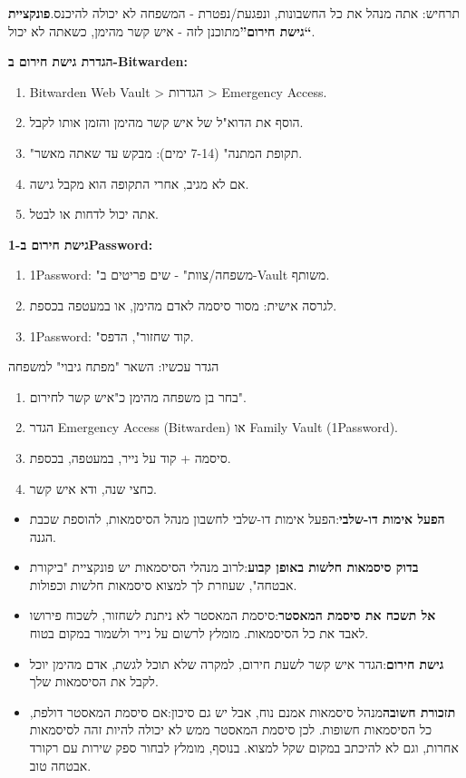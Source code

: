 
תרחיש: אתה מנהל את כל החשבונות, ונפגעת/נפטרת - המשפחה לא יכולה להיכנס.\textbf{פונקציית “גישת חירום”}מתוכנן לזה - איש קשר מהימן, כשאתה לא יכול.

\textbf{הגדרת גישת חירום ב-Bitwarden:}

\begin{enumerate}
  \item Bitwarden Web Vault > הגדרות > Emergency Access.
  \item הוסף את הדוא"ל של איש קשר מהימן והזמן אותו לקבל.
  \item "תקופת המתנה" (7-14 ימים): מבקש עד שאתה מאשר.
  \item אם לא מגיב, אחרי התקופה הוא מקבל גישה.
  \item אתה יכול לדחות או לבטל.
\end{enumerate}

\textbf{גישת חירום ב-1Password:}

\begin{enumerate}
  \item 1Password: "משפחה/צוות" - שים פריטים ב-Vault משותף.
  \item לגרסה אישית: מסור סיסמה לאדם מהימן, או במעטפה בכספת.
  \item 1Password: "קוד שחזור", הדפס.
\end{enumerate}

\begin{tcbpractice}{הגדר עכשיו: השאר "מפתח גיבוי" למשפחה}
\begin{enumerate}
  \item בחר בן משפחה מהימן כ"איש קשר לחירום".
  \item הגדר Emergency Access (Bitwarden) או Family Vault (1Password).
  \item סיסמה + קוד על נייר, במעטפה, בכספת.
  \item כחצי שנה, ודא איש קשר.
\end{enumerate}

\end{tcbpractice}


\begin{itemize}
  \item \textbf{הפעל אימות דו-שלבי}:הפעל אימות דו-שלבי לחשבון מנהל הסיסמאות, להוספת שכבת הגנה.
  \item \textbf{בדוק סיסמאות חלשות באופן קבוע}:לרוב מנהלי הסיסמאות יש פונקציית "ביקורת אבטחה", שעוזרת לך למצוא סיסמאות חלשות וכפולות.
  \item \textbf{אל תשכח את סיסמת המאסטר}:סיסמת המאסטר לא ניתנת לשחזור, לשכוח פירושו לאבד את כל הסיסמאות. מומלץ לרשום על נייר ולשמור במקום בטוח.
  \item \textbf{גישת חירום}:הגדר איש קשר לשעת חירום, למקרה שלא תוכל לגשת, אדם מהימן יוכל לקבל את הסיסמאות שלך.
  \item \textbf{תזכורת חשובה}מנהל סיסמאות אמנם נוח, אבל יש גם סיכון:אם סיסמת המאסטר דולפת, כל הסיסמאות חשופות. לכן סיסמת המאסטר ממש לא יכולה להיות זהה לסיסמאות אחרות, וגם לא להיכתב במקום שקל למצוא. בנוסף, מומלץ לבחור ספק שירות עם רקורד אבטחה טוב.
\end{itemize}

